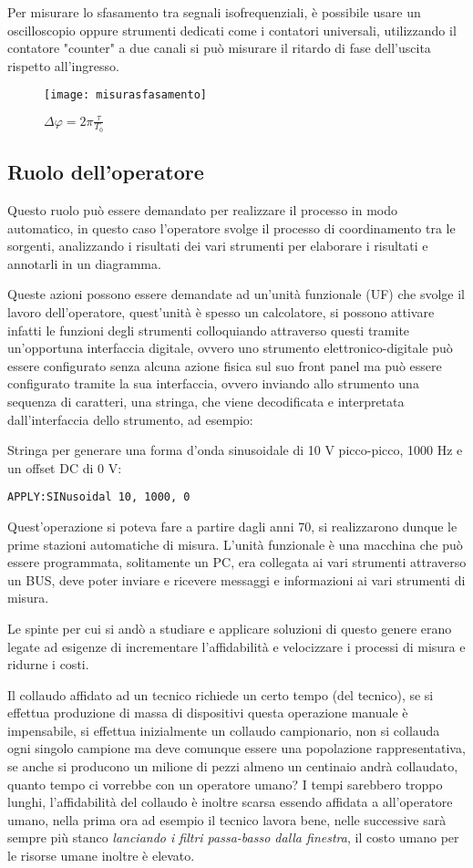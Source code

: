 Per misurare lo sfasamento tra segnali isofrequenziali, è possibile usare
un oscilloscopio
oppure strumenti dedicati come i contatori universali, utilizzando il contatore
"counter" a due
canali si può misurare il ritardo di fase dell'uscita rispetto all'ingresso.
\begin{figure}[h]
\centering\texttt{[image: misurasfasamento]}
\caption{$\Delta\varphi = 2\pi \frac{\tau}{T_0}$}
\end{figure}


\subsection{Ruolo dell'operatore}
Questo ruolo può essere demandato per realizzare il processo in modo automatico,
in questo caso l'operatore
svolge il processo di coordinamento tra le sorgenti, analizzando i risultati dei
vari strumenti per
elaborare i risultati e annotarli in un diagramma.

Queste azioni possono essere demandate ad un'unità funzionale (UF) che svolge il
lavoro
dell'operatore, quest'unità è spesso un calcolatore, si possono attivare infatti
le funzioni degli
strumenti colloquiando attraverso questi tramite un'opportuna interfaccia
digitale, ovvero uno
strumento elettronico-digitale può essere configurato senza alcuna azione fisica
sul suo front
panel ma può essere configurato tramite la sua interfaccia, ovvero inviando allo
strumento una
sequenza di caratteri, una stringa, che viene decodificata e interpretata
dall'interfaccia dello
strumento, ad esempio:

Stringa per generare una forma d'onda sinusoidale di 10 V picco-picco, 1000 Hz
e un offset DC di 0 V:

\noindent
\verb|APPLY:SINusoidal 10, 1000, 0|

Quest'operazione si poteva fare a partire dagli anni 70, si realizzarono dunque
le prime stazioni
automatiche di misura.
L'unità funzionale è una macchina che può essere programmata, solitamente un PC,
era collegata ai
vari strumenti attraverso un BUS, deve poter inviare e ricevere messaggi e
informazioni ai vari
strumenti di misura.

Le spinte per cui si andò a studiare e applicare soluzioni di questo genere
erano legate ad
esigenze di incrementare l'affidabilità e velocizzare i processi di misura e
ridurne i costi.

Il collaudo affidato ad un tecnico richiede un certo tempo (del tecnico), se si
effettua produzione
di massa di dispositivi questa operazione manuale è impensabile, si effettua
inizialmente un
collaudo campionario, non si collauda ogni singolo campione ma deve comunque
essere una popolazione
rappresentativa, se anche si producono un milione di pezzi almeno un centinaio
andrà
collaudato, quanto tempo ci vorrebbe con un operatore umano? I tempi sarebbero
troppo lunghi,
l'affidabilità del collaudo è inoltre scarsa essendo affidata a all'operatore
umano, nella prima
ora ad esempio il tecnico lavora bene, nelle successive sarà sempre più stanco
\textit{lanciando i filtri
passa-basso dalla finestra}, il costo umano per le risorse umane inoltre è
elevato.


